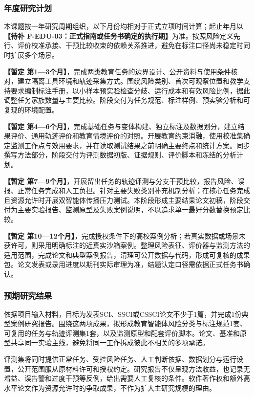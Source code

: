 \justifying
\NSFCBodyText

\subsubsection{年度研究计划}

本课题按一年研究周期组织，以下月份均相对于正式立项时间计算；起止年月以\textbf{【待补 F-EDU-03：正式指南或任务书确定的执行期】}为准。按照风险定义先行、评价校准承接、干预比较收束的依赖关系推进，避免在标注口径尚未稳定时同时扩展多个场景。

\textbf{【暂定 第1—3个月】}，完成两类教育任务的边界设计、公开资料与使用条件核对，建立隔离工具环境和轨迹采集方式。围绕风险类别、首次可观察位置和教学支持要求编制标注手册，以小样本预实验检查分歧、运行成本和有效风险比例，据此调整任务家族数量与主要比较。阶段交付为任务规范、标注样例、预实验分析和可复现的环境配置。

\textbf{【暂定 第4—6个月】}，完成基础任务与变体构建、独立标注及数据划分，建立结果评价、通用轨迹评价和教育情境评价的对照。开展教育约束消融，使用校准集确定监测工作点与效用要求，并在读取测试结果之前明确主要终点和统计方案。同步撰写方法部分，阶段交付为评测数据初版、证据规则、评价脚本和冻结的分析计划。

\textbf{【暂定 第7—9个月】}，开展留出任务的轨迹评测与分支干预比较，报告风险、误报、正常任务完成和人工负担。针对主要失败类别补充机制分析；在核心任务完成且资源允许时开展双智能体传播压力测试。本阶段形成主要结果论文初稿，阶段交付为主要实验报告、监测原型及失败案例说明，不以追求单一最好分数替换预定比较。

\textbf{【暂定 第10—12个月】}，完成授权条件下的高校案例分析；若真实数据或场景未获许可，则采用明确标注的近真实沙箱案例。整理风险表征、评价器与监测方法的适用范围，完成论文和典型案例报告，清理可公开数据与代码，形成可复核的成果包。论文发表或录用进度以期刊实际审理为准，结题认定口径需依据正式任务书确认。

\subsubsection{预期研究结果}

依据项目输入材料，目标为发表SCI、SSCI或CSSCI论文不少于1篇，并完成1份典型案例研究报告。围绕这两项成果，拟形成教育智能体风险分类与标注规范1套、可复用的任务与轨迹评测集1套，以及监测原型和配套评价脚本。论文、基准和原型共享同一实验主线，避免将同一工作拆成彼此不相关的多项承诺。

评测集将同时提供正常任务、受控风险任务、人工判断依据、数据划分与运行设置，公开范围服从原材料许可和授权约定。研究报告不仅呈现方法收益，也记录无增益、误告警和过度干预等反例，给出需要人工复核的条件。软件著作权和额外高水平论文作为资源允许时的争取成果，不作为扩大主研究规模的理由。

